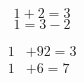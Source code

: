 \documentclass{article}
\begin{document}
	\begin{equation*}
	1+2=3
		\end{equation*}
	\begin{equation*}
	1=3-2
	\end{equation*}
	
	\begin{align*}
	1&+92=3\\
	1&+6=7
	\end{align*}
\end{document}
